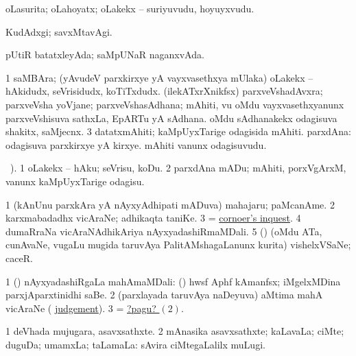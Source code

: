 \bentry
{}
\gl{\nA}
\bmng
oLasurita; oLahoyatx; oLakekx -- suriyuvudu, hoyuyxvudu. 
\emng
\eentry

\bentry
{}
\gl{\kirxvi}
\expl{\Latin }
\bmng
KudAdxgi; savxMtavAgi. 
\emng
\eentry

\bentry
{}
\gl{\gu}
\expl{\Latin }
\bmng
pUtiR batatxleyAda; saMpUNaR naganxvAda. 
\emng
\eentry

\bentry
{}
\gl{\nA}
\bmng
\bnum
\num{1} saMBAra; (yAvudeV parxkirxye yA vayxvasethxya mUlaka) oLakekx -- hAkidudx, seVrisidudx, koTiTxdudx. 
 (ilekATxrXnikfsx) 
\banum
{} parxveVshadAvxra; parxveVsha yoVjane; parxveVshasAdhana; mAhiti, \mo vu oMdu vayxvasethxyanunx parxveVshisuva sathxLa, EpARTu yA sAdhana. 
 oMdu sAdhanakekx odagisuva shakitx, saMjecnx. 
\eanum
\numie
\num{3} datatxmAhiti; kaMpUyxTarige odagisida mAhiti. 
 parxdAna: 
\banum
{} odagisuva parxkirxye yA kirxye. 
 mAhiti \mo vanunx odagisuvudu. 
\eanum
\numie
\enum
\emng
\eentry

\bentry
{}
\gl{\sakirx}
 \vakaq\ ).\bmng
\bnum
\num{1} oLakekx -- hAku; seVrisu, koDu. 
\num{2} parxdAna mADu; mAhiti, porxVgArxM, \mo vanunx kaMpUyxTarige odagisu. 
\enum
\emng
\eentry

\bentry
{}
\gl{\nA}
\bmng
\bnum
\num{1} (kAnUnu parxkAra yA nAyxyAdhipati mADuva) mahajaru; paMcanAme. 
\num{2} karxmabadadhx vicAraNe; adhikaqta taniKe. 
\num{3} = \hyperref{kandict_c.pdf}{C}{coroner's inquest}{cornoer's inquest}. 
\num{4} dumaRraNa vicAraNAdhikAriya nAyxyadashiRmaMDali. 
\num{5} (\AmA) (oMdu ATa, cunAvaNe, \mo vugaLu mugida taruvAya PalitAMshagaLanunx kurita) vishelxVSaNe; caceR. 
\enum
\emng

\noindent 
\gl{\pagu}
\bmng
\bnum
\num{1}  (\ca) nAyxyadashiRgaLa mahAmaMDali:  (\birx) hwsf Aphf kAmanfsx; iMgelxMDina parxjAparxtinidhi saBe. 
\hypertarget{inquest pagu2}{} 
\num{2}  (parxlayada taruvAya naDeyuva) aMtima mahA vicAraNe ( \hyperref{kandict_j.pdf}{J}{judgement}{judgement}). 
\num{3}  = \hyperlink{inquest pagu2}{?pagu? \((2)\)}. 
\enum
\emng
\eentry

\bentry
{}
\gl{\nA}
\bmng
\bnum
\num{1} deVhada mujugara, asavxsathxte. 
\num{2} mAnasika asavxsathxte; kaLavaLa; ciMte; duguDa; umamxLa; taLamaLa:  sAvira ciMtegaLalilx muLugi. 
\enum
\emng
\eentry

